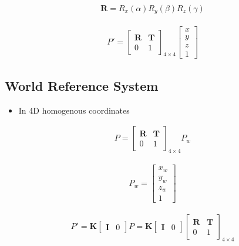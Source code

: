 \documentclass[letterpaper,12pt]{article}
\newcommand{\vect}[1]{\mathbf{#1}}
\newcommand{\matr}[1]{\mathbf{#1}}
\begin{document}
\begin{align}
 \matr{R} = R_x(\alpha) R_y(\beta) R_z(\gamma)
\end{align}

\begin{align}
 P' = \begin{bmatrix}
  \matr{R} & \vect{T} \\
  0        & 1
 \end{bmatrix}_{4 \times 4}
 \begin{bmatrix}
  x \\
  y \\
  z \\
  1
 \end{bmatrix}
\end{align}

\subsection{World Reference System}
\begin{itemize}
 \item In 4D homogenous coordinates
\end{itemize}
\begin{align}
 P = \begin{bmatrix}
  \matr{R} & \vect{T} \\
  0        & 1
 \end{bmatrix}_{4 \times 4}
 P_w
\end{align}

\begin{align}
 P_w = \begin{bmatrix}
  x_w \\
  y_w \\
  z_w \\
  1
 \end{bmatrix}
\end{align}

\begin{align}
 P' = \matr{K} \begin{bmatrix}
  \matr{I} & 0
 \end{bmatrix}
 P
 = \matr{K} \begin{bmatrix}
  \matr{I} & 0
 \end{bmatrix}
 \begin{bmatrix}
  \matr{R} & \vect{T} \\
  0        & 1
 \end{bmatrix}_{4 \times 4}
\end{align}
\end{document}
